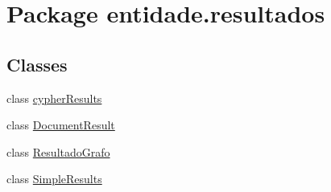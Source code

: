 \hypertarget{namespaceentidade_1_1resultados}{}\section{Package entidade.\+resultados}
\label{namespaceentidade_1_1resultados}
\subsection*{Classes}
\begin{DoxyCompactItemize}
\item 
class \hyperlink{classentidade_1_1resultados_1_1cypherResults}{cypher\+Results}
\item 
class \hyperlink{classentidade_1_1resultados_1_1DocumentResult}{Document\+Result}
\item 
class \hyperlink{classentidade_1_1resultados_1_1ResultadoGrafo}{Resultado\+Grafo}
\item 
class \hyperlink{classentidade_1_1resultados_1_1SimpleResults}{Simple\+Results}
\end{DoxyCompactItemize}
